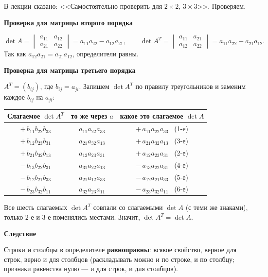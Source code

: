 \documentclass[a4paper,11pt]{article}
\newcommand{\podr}[1]{\par\needspace{8\baselineskip}\medskip
  {\large\bfseries\textcolor{oprc!80!black}{#1}}\par\nopagebreak\smallskip}
\begin{document}
В лекции сказано: <<Самостоятельно проверить для $2 \times 2$, $3 \times 3$>>. Проверяем.

\podr{Проверка для матрицы второго порядка}

\[
  \det A = \begin{vmatrix} a_{11} & a_{12} \\ a_{21} & a_{22} \end{vmatrix} = a_{11} a_{22} - a_{12} a_{21}, \qquad
  \det A^T = \begin{vmatrix} a_{11} & a_{21} \\ a_{12} & a_{22} \end{vmatrix} = a_{11} a_{22} - a_{21} a_{12}.
\]
Так как $a_{12} a_{21} = a_{21} a_{12}$, определители равны. \checkmark

\podr{Проверка для матрицы третьего порядка}

$A^T = (b_{ij})$, где $b_{ij} = a_{ji}$. Запишем $\det A^T$ по правилу треугольников и заменим каждое $b_{ij}$ на $a_{ji}$:

\begin{center}
\renewcommand{\arraystretch}{1.3}
\begin{tabular}{|c|c|c|}
\hline
\textbf{Слагаемое $\det A^T$} & \textbf{то же через $a$} & \textbf{какое это слагаемое $\det A$} \\ \hline
$+\,b_{11} b_{22} b_{33}$ & $a_{11} a_{22} a_{33}$ & $+\,a_{11} a_{22} a_{33}$ \ (1-е) \\
$+\,b_{12} b_{23} b_{31}$ & $a_{21} a_{32} a_{13}$ & $+\,a_{21} a_{32} a_{13}$ \ (3-е) \\
$+\,b_{21} b_{32} b_{13}$ & $a_{12} a_{23} a_{31}$ & $+\,a_{12} a_{23} a_{31}$ \ (2-е) \\
$-\,b_{13} b_{22} b_{31}$ & $a_{31} a_{22} a_{13}$ & $-\,a_{13} a_{22} a_{31}$ \ (4-е) \\
$-\,b_{12} b_{21} b_{33}$ & $a_{21} a_{12} a_{33}$ & $-\,a_{12} a_{21} a_{33}$ \ (5-е) \\
$-\,b_{23} b_{32} b_{11}$ & $a_{32} a_{23} a_{11}$ & $-\,a_{23} a_{32} a_{11}$ \ (6-е) \\ \hline
\end{tabular}
\end{center}

Все шесть слагаемых $\det A^T$ совпали со слагаемыми $\det A$ (с теми же знаками), только 2-е и 3-е поменялись местами.
Значит, $\det A^T = \det A$. \checkmark

\podr{Следствие}

Строки и столбцы в определителе \textbf{равноправны}: всякое свойство, верное для строк, верно и для столбцов
(раскладывать можно и по строке, и по столбцу; признаки равенства нулю --- и для строк, и для столбцов).
\end{document}
